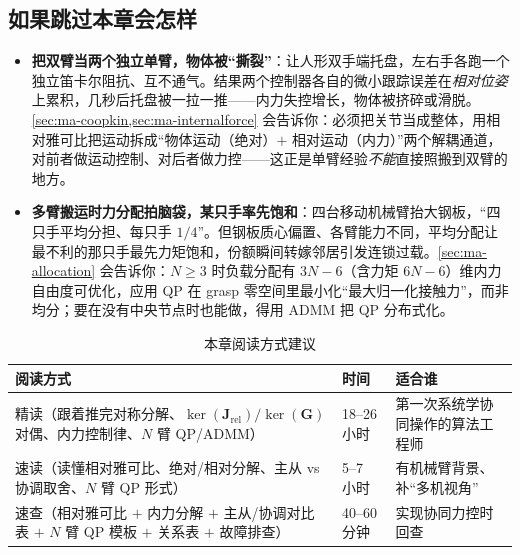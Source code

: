 \subsection*{如果跳过本章会怎样}
\begin{itemize}
  \item \textbf{把双臂当两个独立单臂，物体被“撕裂”}：让人形双手端托盘，左右手各跑一个独立笛卡尔阻抗、互不通气。结果两个控制器各自的微小跟踪误差在\emph{相对位姿}上累积，几秒后托盘被一拉一推——内力失控增长，物体被挤碎或滑脱。\cref{sec:ma-coopkin,sec:ma-internalforce} 会告诉你：必须把关节当成整体，用相对雅可比把运动拆成“物体运动（绝对）$+$ 相对运动（内力）”两个解耦通道，对前者做运动控制、对后者做力控——这正是单臂经验\emph{不能}直接照搬到双臂的地方。
  \item \textbf{多臂搬运时力分配拍脑袋，某只手率先饱和}：四台移动机械臂抬大钢板，“四只手平均分担、每只手 $1/4$”。但钢板质心偏置、各臂能力不同，平均分配让最不利的那只手最先力矩饱和，份额瞬间转嫁邻居引发连锁过载。\cref{sec:ma-allocation} 会告诉你：$N\ge3$ 时负载分配有 $3N-6$（含力矩 $6N-6$）维内力自由度可优化，应用 QP 在 grasp 零空间里最小化“最大归一化接触力”，而非均分；要在没有中央节点时也能做，得用 ADMM 把 QP 分布式化。
\end{itemize}

\begin{table}[H]\centering\small
\caption{本章阅读方式建议}
\label{tab:ma-reading}
\begin{tabularx}{\linewidth}{LlL}
\toprule
阅读方式 & 时间 & 适合谁 \\
\midrule
精读（跟着推完对称分解、$\ker(\mathbf{J}_{\text{rel}})/\ker(\mathbf{G})$ 对偶、内力控制律、$N$ 臂 QP/ADMM） & 18--26 小时 & 第一次系统学协同操作的算法工程师 \\
速读（读懂相对雅可比、绝对/相对分解、主从 vs 协调取舍、$N$ 臂 QP 形式） & 5--7 小时 & 有机械臂背景、补“多机视角” \\
速查（相对雅可比 $+$ 内力分解 $+$ 主从/协调对比表 $+$ $N$ 臂 QP 模板 $+$ 关系表 $+$ 故障排查） & 40--60 分钟 & 实现协同力控时回查 \\
\bottomrule
\end{tabularx}
\end{table}

